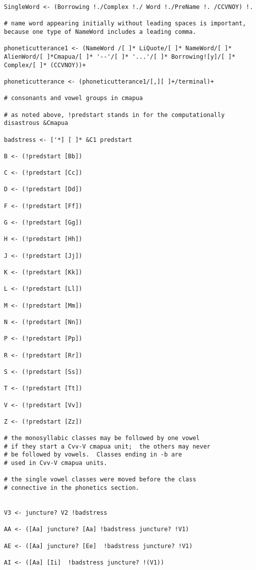 \documentclass[12pt]{book}
\begin{document}
{\begin{verbatim}
SingleWord <- (Borrowing !./Complex !./ Word !./PreName !. /CCVNOY) !.

# name word appearing initially without leading spaces is important, because one type of NameWord includes a leading comma.

phoneticutterance1 <- (NameWord /[ ]* LiQuote/[ ]* NameWord/[ ]* AlienWord/[ ]*Cmapua/[ ]* '--'/[ ]* '...'/[ ]* Borrowing![y]/[ ]* Complex/[ ]* (CCVNOY))+

phoneticutterance <- (phoneticutterance1/[,][ ]+/terminal)+

# consonants and vowel groups in cmapua

# as noted above, !predstart stands in for the computationally disastrous &Cmapua

badstress <- ['*] [ ]* &C1 predstart

B <- (!predstart [Bb])

C <- (!predstart [Cc])

D <- (!predstart [Dd])

F <- (!predstart [Ff])

G <- (!predstart [Gg])

H <- (!predstart [Hh])

J <- (!predstart [Jj])

K <- (!predstart [Kk])

L <- (!predstart [Ll])

M <- (!predstart [Mm])

N <- (!predstart [Nn])

P <- (!predstart [Pp])

R <- (!predstart [Rr])

S <- (!predstart [Ss])

T <- (!predstart [Tt])

V <- (!predstart [Vv])

Z <- (!predstart [Zz])

# the monosyllabic classes may be followed by one vowel
# if they start a Cvv-V cmapua unit;  the others may never
# be followed by vowels.  Classes ending in -b are
# used in Cvv-V cmapua units.

# the single vowel classes were moved before the class
# connective in the phonetics section.


V3 <- juncture? V2 !badstress

AA <- ([Aa] juncture? [Aa] !badstress juncture? !V1)  

AE <- ([Aa] juncture? [Ee]  !badstress juncture? !V1)  

AI <- ([Aa] [Ii]  !badstress juncture? !(V1))  


\end{verbatim}}
\end{document}

